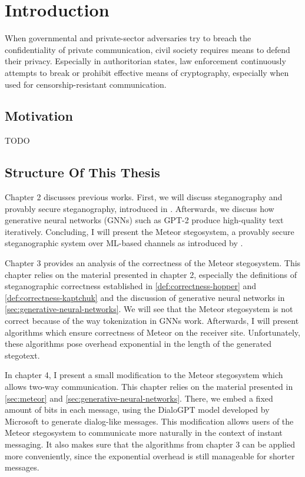 \chapter{Introduction}

When governmental and private-sector adversaries try to breach the confidentiality of private communication, civil society requires means to defend their privacy.
Especially in authoritorian states, law enforcement continuously attempts to break or prohibit effective means of cryptography, especially when used for censorship-resistant communication.

\section{Motivation}

TODO

\section{Structure Of This Thesis}

Chapter 2 discusses previous works.
First, we will discuss steganography and provably secure steganography, introduced in \cite{Hopper04}.
Afterwards, we discuss how generative neural networks (GNNs) such as GPT-2 produce high-quality text iteratively.
Concluding, I will present the Meteor stegosystem, a provably secure steganographic system over ML-based channels as introduced by \cite{Meteor2021}.

Chapter 3 provides an analysis of the correctness of the Meteor stegosystem. 
This chapter relies on the material presented in chapter 2, especially the definitions of steganographic correctness established in \autoref{def:correctness-hopper} and \autoref{def:correctness-kaptchuk} and the discussion of generative neural networks in \autoref{sec:generative-neural-networks}.
We will see that the Meteor stegosystem is not correct because of the way tokenization in GNNs work.
Afterwards, I will present algorithms which ensure correctness of Meteor on the receiver site.
Unfortunately, these algorithms pose overhead exponential in the length of the generated stegotext.

In chapter 4, I present a small modification to the Meteor stegosystem which allows two-way communication.
This chapter relies on the material presented in \autoref{sec:meteor} and \autoref{sec:generative-neural-networks}.
There, we embed a fixed amount of bits in each message, using the DialoGPT model developed by Microsoft \cite{Zhang2020} to generate dialog-like messages.
This modification allows users of the Meteor stegosystem to communicate more naturally in the context of instant messaging.
It also makes sure that the algorithms from chapter 3 can be applied more conveniently, since the exponential overhead is still manageable for shorter messages.

